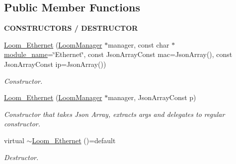 \subsection*{Public Member Functions}
\begin{Indent}{\bf C\+O\+N\+S\+T\+R\+U\+C\+T\+O\+RS / D\+E\+S\+T\+R\+U\+C\+T\+OR}\par
\begin{DoxyCompactItemize}
\item 
\hyperlink{class_loom___ethernet_a7f3a01c22467bb74b4ee421db507d4c8}{Loom\+\_\+\+Ethernet} (\hyperlink{class_loom_manager}{Loom\+Manager} $\ast$manager, const char $\ast$\hyperlink{class_loom_module_adf6e68ad7e9fa2acfca7a8a280680764}{module\+\_\+name}=\char`\"{}Ethernet\char`\"{}, const Json\+Array\+Const mac=Json\+Array(), const Json\+Array\+Const ip=Json\+Array())
\begin{DoxyCompactList}\small\item\em Constructor. \end{DoxyCompactList}\item 
\hyperlink{class_loom___ethernet_aa03b81c5af2dc257f5a52f4dbe0f6714}{Loom\+\_\+\+Ethernet} (\hyperlink{class_loom_manager}{Loom\+Manager} $\ast$manager, Json\+Array\+Const p)
\begin{DoxyCompactList}\small\item\em Constructor that takes Json Array, extracts args and delegates to regular constructor. \end{DoxyCompactList}\item 
virtual \hyperlink{class_loom___ethernet_ab083d7e571e429c5741b7dfa1b3bd5a1}{$\sim$\+Loom\+\_\+\+Ethernet} ()=default
\begin{DoxyCompactList}\small\item\em Destructor. \end{DoxyCompactList}\end{DoxyCompactItemize}
\end{Indent}

